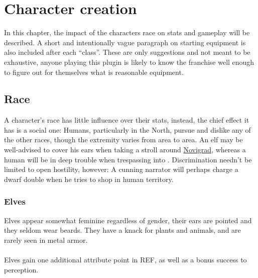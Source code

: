 \documentclass[parskip=full,11pt,%
footheight=38pt]{scrreport}
\begin{document}
\chapter{Character creation}
In this chapter, the impact of the characters race on stats and gameplay will be described. A short and intentionally vague paragraph on starting
equipment is also included after each ``class''. These are only suggestions and not meant to be exhaustive, anyone playing this plugin is likely
to know the franchise well enough to figure out for themselves what is reasonable equipment.

\section{Race}
A character's race has little influence over their stats, instead, the chief effect it has is a social one: Humans, particularly in the North,
pursue and dislike any of the other races, though the extremity varies from area to area. An elf may be well-advised to cover his ears when
taking a stroll around \hyperref[city:novigrad]{Novigrad}, whereas a human will be in deep trouble when trespassing into .
Discrimination needn't be limited to open hostility, however: A cunning narrator will perhaps charge a dwarf double when he tries to shop in
human territory.

\subsection{Elves}
Elves appear somewhat feminine regardless of gender, their ears are pointed and they seldom
wear beards. They have a knack for plants and animals, and are rarely seen in metal armor.
\\\\
Elves gain one additional attribute point in REF, as well as a bonus success to perception.
\end{document}
